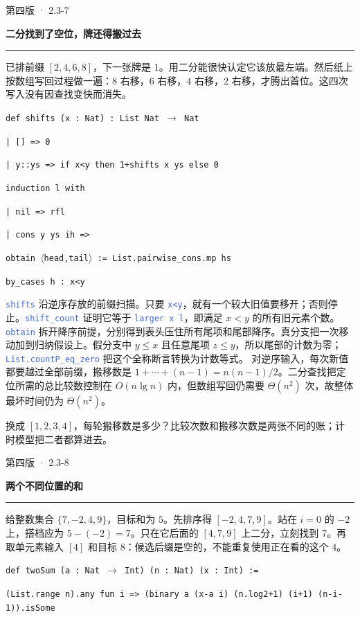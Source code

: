 \documentclass[UTF8,11pt,a4paper,fontset=fandol]{ctexart}
\newcommand{\HandoutLesson}[2]{%
  \par{\small\heiti\color{BrickRed}#1}\par\vspace{3pt}
  {\fontsize{21}{27}\selectfont\heiti\bfseries #2}\par
  \textcolor{BrickRed}{\rule{\linewidth}{.7pt}}\par}
\newcommand{\HandoutBox}[1]{%
  \par\noindent\begingroup\setlength{\fboxsep}{8pt}%
  \colorbox{BrickRed!9}{\parbox{\dimexpr\linewidth-16pt\relax}{#1}}\endgroup\par}
\newcommand{\src}[1]{\textcolor{RoyalBlue}{\texttt{#1}}}
\newenvironment{leanblock}{\par\smallskip\noindent\begin{lrbox}{\leanbox}\begin{minipage}{\dimexpr\linewidth-12pt\relax}\raggedright\small\setlength{\parskip}{0pt}}{\end{minipage}\end{lrbox}\colorbox{RoyalBlue!6}{\usebox{\leanbox}}\par\smallskip}
\newcommand{\lineofcode}[2]{\noindent\hspace*{#1em}\strut\texttt{#2}\par}
\begin{document}
\par{}
\clearpage{}\label{p38}\HandoutLesson{第四版 · 2.3-7}{二分找到了空位，牌还得搬过去}
已排前缀 $[2,4,6,8]$，下一张牌是 $1$。用二分能很快认定它该放最左端。然后纸上按数组写回过程做一遍：$8$ 右移，$6$ 右移，$4$ 右移，$2$ 右移，才腾出首位。这四次写入没有因查找变快而消失。
\begin{leanblock}
\lineofcode{0.0}{def shifts (x : Nat) : List Nat \ensuremath{\to} Nat}
\lineofcode{0.9}{| [] => 0}
\lineofcode{0.9}{| y::ys => if x<y then 1+shifts x ys else 0}
\end{leanblock}
\begin{leanblock}
\lineofcode{0.9}{induction l with}
\lineofcode{0.9}{| nil => rfl}
\lineofcode{0.9}{| cons y ys ih =>}
\lineofcode{1.8}{obtain \ensuremath{\langle}head,tail\ensuremath{\rangle} := List.pairwise\_cons.mp hs}
\lineofcode{1.8}{by\_cases h : x<y}
\end{leanblock}
\src{shifts} 沿逆序存放的前缀扫描。只要 \src{x<y}，就有一个较大旧值要移开；否则停止。\src{shift\_count} 证明它等于 \src{larger x l}，即满足 $x<y$ 的所有旧元素个数。\src{obtain} 拆开降序前提，分别得到表头压住所有尾项和尾部降序。真分支把一次移动加到归纳假设上。假分支中 $y\le x$ 且任意尾项 $z\le y$，所以尾部的计数为零；\src{List.countP\_eq\_zero} 把这个全称断言转换为计数等式。
对逆序输入，每次新值都要越过全部前缀，搬移数是 $1+\cdots+(n-1)=n(n-1)/2$。二分查找把定位所需的总比较数控制在 $O(n\lg n)$ 内，但数组写回仍需要 $\Theta(n^2)$ 次，故整体最坏时间仍为 $\Theta(n^2)$。
\HandoutBox{换成 $[1,2,3,4]$，每轮搬移数是多少？比较次数和搬移次数是两张不同的账；计时模型把二者都算进去。}
\par{}
\clearpage{}\label{p39}\HandoutLesson{第四版 · 2.3-8}{两个不同位置的和}
给整数集合 $\{7,-2,4,9\}$，目标和为 $5$。先排序得 $[-2,4,7,9]$。站在 $i=0$ 的 $-2$ 上，搭档应为 $5-(-2)=7$。只在它后面的 $[4,7,9]$ 上二分，立刻找到 $7$。再取单元素输入 $[4]$ 和目标 $8$：候选后缀是空的，不能重复使用正在看的这个 $4$。
\begin{leanblock}
\lineofcode{0.0}{def twoSum (a : Nat \ensuremath{\to} Int) (n : Nat) (x : Int) :=}
\lineofcode{0.9}{(List.range n).any fun i => (binary a (x-a i) (n.log2+1) (i+1) (n-i-1)).isSome}
\end{leanblock}
\end{document}
